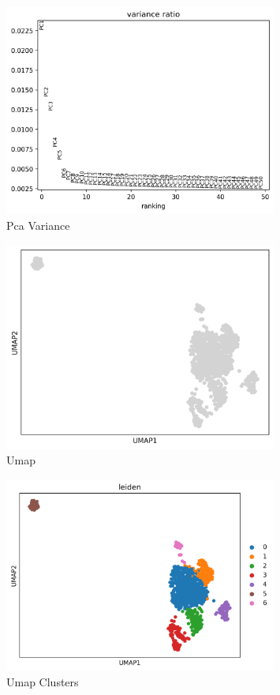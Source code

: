 \documentclass[12pt]{article}
\begin{document}
    \begin{figure}[H]
        \centering
        \includegraphics[width=0.8\textwidth]{pca_variance.png}
        \caption{Pca Variance}
        \label{fig:pca_variance}
    \end{figure}
    \newpage

    \begin{figure}[H]
        \centering
        \includegraphics[width=0.8\textwidth]{umap.png}
        \caption{Umap}
        \label{fig:umap}
    \end{figure}
    \newpage

    \begin{figure}[H]
        \centering
        \includegraphics[width=0.8\textwidth]{umap_clusters.png}
        \caption{Umap Clusters}
        \label{fig:umap_clusters}
    \end{figure}
    \newpage
\end{document}
